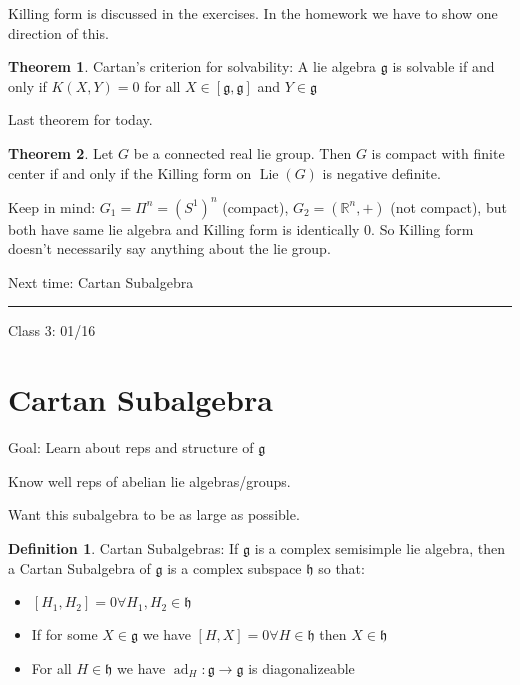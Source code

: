 \documentclass{article}
\theoremstyle{definition}
\newtheorem{definition}{Definition}
\newtheorem{theorem}{Theorem}
\newcommand{\ad}{\operatorname{ad}}
\newcommand{\Lie}{\operatorname{Lie}}
\begin{document}
Killing form is discussed in the exercises. In the homework we have to show one direction of this.

\begin{theorem}
    Cartan's criterion for solvability: A lie algebra \(\mathfrak{g} \) is solvable if and only if \(K(X,Y)=0\) for all \(X\in [\mathfrak{g},\mathfrak{g}  ]\) and \(Y\in \mathfrak{g} \)   
\end{theorem}

Last theorem for today.

\begin{theorem}
    Let \(G\) be a connected real lie group. Then \(G\) is compact with finite center if and only if the Killing form on \(\Lie(G)\) is negative definite.
\end{theorem}

Keep in mind: \(G_1=\Pi ^n=(S^1)^n\) (compact), \(G_2=(\mathbb{R} ^n,+)\) (not compact), but both have same lie algebra and Killing form is identically \(0\). So Killing form doesn't necessarily say anything about the lie group.

Next time: Cartan Subalgebra

\hrule
\hfil

Class 3: 01/16

\section*{Cartan Subalgebra}

Goal: Learn about reps and structure of \(\mathfrak{g} \)

Know well reps of abelian lie algebras/groups.

Want this subalgebra to be as large as possible.

\begin{definition}
    Cartan Subalgebras: If \(\mathfrak{g} \) is a complex semisimple lie algebra, then a Cartan Subalgebra of \(\mathfrak{g} \) is a complex subspace \(\mathfrak{h} \) so that:

    \begin{itemize}
        \item \([H_1,H_2]=0 \forall H_1,H_2\in \mathfrak{h}\)
        \item If for some \(X\in \mathfrak{g} \) we have \([H,X]=0\forall H\in \mathfrak{h} \) then \(X\in \mathfrak{h} \) 
        \item For all \(H\in \mathfrak{h} \) we have \(\ad_H:\mathfrak{g} \to \mathfrak{g} \) is diagonalizeable 
    \end{itemize}

\end{definition}
\end{document}
